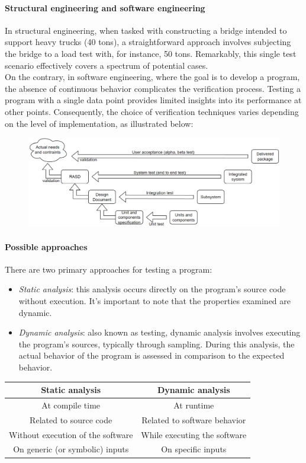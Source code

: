 \paragraph*{Structural engineering and software engineering}
In structural engineering, when tasked with constructing a bridge intended to support heavy trucks (40 tons), a straightforward approach involves subjecting the bridge to a load test with, for instance, 50 tons. 
Remarkably, this single test scenario effectively covers a spectrum of potential cases. \\
On the contrary, in software engineering, where the goal is to develop a program, the absence of continuous behavior complicates the verification process. 
Testing a program with a single data point provides limited insights into its performance at other points.
Consequently, the choice of verification techniques varies depending on the level of implementation, as illustrated below:
\begin{figure}[H]
    \centering
    \includegraphics[width=1\linewidth]{images/ver1.png}
\end{figure}

\paragraph*{Possible approaches}
There are two primary approaches for testing a program:
\begin{itemize}
    \item \textit{Static analysis}: this analysis occurs directly on the program's source code without execution. 
        It's important to note that the properties examined are dynamic.
    \item \textit{Dynamic analysis}: also known as testing, dynamic analysis involves executing the program's sources, typically through sampling. 
        During this analysis, the actual behavior of the program is assessed in comparison to the expected behavior.
\end{itemize}
\begin{table}[H]
    \centering
    \begin{tabular}{cc}
    \hline
    \textbf{Static analysis}          & \textbf{Dynamic analysis}    \\ \hline
    At compile time                   & At runtime                   \\
    Related to source code            & Related to software behavior \\
    Without execution of the software & While executing the software \\
    On generic (or symbolic) inputs   & On specific inputs           \\ \hline
    \end{tabular}
\end{table}